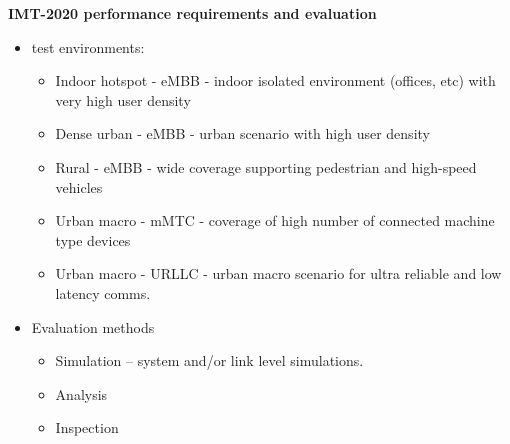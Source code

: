 \documentclass{beamer}
\begin{document}
\begin{frame}[allowframebreaks]
		\newpage
		\textbf{IMT-2020 performance requirements and evaluation}
		\begin{itemize}
			\item test environments:
			\begin{itemize}
				\item Indoor hotspot - eMBB - indoor isolated environment (offices, etc) with very high user density
				\item Dense urban - eMBB - urban scenario with high user density
				\item Rural - eMBB - wide coverage supporting pedestrian and high-speed vehicles
				\item Urban macro - mMTC - coverage of high number of connected machine type devices
				\item Urban macro - URLLC - urban macro scenario for ultra reliable and low latency comms.
			\end{itemize}
			\item Evaluation methods
			\begin{itemize}
				\item Simulation -- system and/or link level simulations. 
				\item Analysis
				\item Inspection
			\end{itemize}
		\end{itemize}
	

\end{frame}
\end{document}
